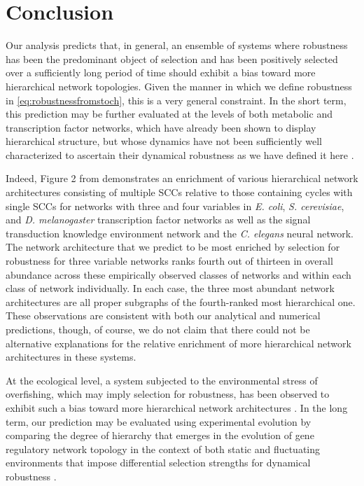 \section{Conclusion}
Our analysis predicts that, in general, an ensemble of systems where robustness has been the predominant object of selection and has been positively selected over a sufficiently long period of time should exhibit a bias toward more hierarchical network topologies. Given the manner in which we define robustness in \ref{eq:robustnessfromstoch}, this is a very general constraint. In the short term, this prediction may be further evaluated at the levels of both metabolic and transcription factor networks, which have already been shown to display hierarchical structure, but whose dynamics have not been sufficiently well characterized to ascertain their dynamical robustness as we have defined it here \cite{Zhao2006,Bhardwaj2010,Colm,Prill2005}.

Indeed, Figure 2 from \cite{Prill2005} demonstrates an enrichment of various hierarchical network architectures consisting of multiple SCCs relative to those containing cycles with single SCCs for networks with three and four variables in \emph{E. coli}, \emph{S. cerevisiae}, and \emph{D. melanogaster} transcription factor networks as well as the signal transduction knowledge environment network and the \emph{C. elegans} neural network. The network architecture that we predict to be most enriched by selection for robustness for three variable networks ranks fourth out of thirteen in overall abundance across these empirically observed classes of networks and within each class of network individually. In each case, the three most abundant network architectures are all proper subgraphs of the fourth-ranked most hierarchical one. These observations are consistent with both our analytical and numerical predictions, though, of course, we do not claim that there could not be alternative explanations for the relative enrichment of more hierarchical network architectures in these systems.

At the ecological level, a system subjected to the environmental stress of overfishing, which may imply selection for robustness, has been observed to exhibit such a bias toward more hierarchical network architectures \cite{Bascompte2005}.
In the long term, our prediction may be evaluated using experimental evolution by comparing the degree of hierarchy that emerges in the evolution of gene regulatory network topology in the context of both static and fluctuating environments that impose differential selection strengths for dynamical robustness \cite{Leroi1994,Hindre2012}.

